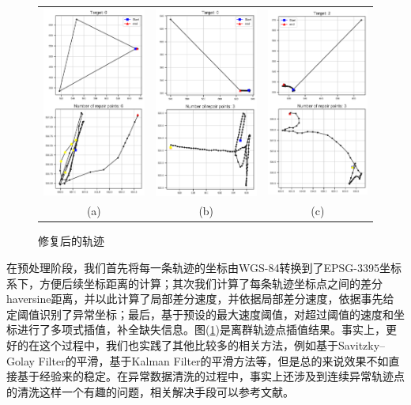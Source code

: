 \documentclass[UTF8, 12pt]{ctexart}
\begin{document}
		\begin{figure}[H]
			\centering
			\begin{tabular}{ccc}
				\includegraphics[width=0.27\linewidth]{..//plots//traj_filtering_396.png} & \includegraphics[width=0.27\linewidth]{..//plots//traj_filtering_691.png} &
				\includegraphics[width=0.27\linewidth]{..//plots//traj_filtering_1093.png} \\
				(a) & (b) & (c)
			\end{tabular}
			\caption{修复后的轨迹}
			\label{sec_2_fig_0}
			\vspace{-0.2cm}
		\end{figure}
		在预处理阶段，我们首先将每一条轨迹的坐标由WGS-84转换到了EPSG-3395坐标系下，方便后续坐标距离的计算；其次我们计算了每条轨迹坐标点之间的差分haversine距离，并以此计算了局部差分速度，并依据局部差分速度，依据事先给定阈值识别了异常坐标；最后，基于预设的最大速度阈值，对超过阈值的速度和坐标进行了多项式插值，补全缺失信息。图(\ref{sec_2_fig_0})是离群轨迹点插值结果。事实上，更好的在这个过程中，我们也实践了其他比较多的相关方法，例如基于Savitzky–Golay Filter\cite{Schafer2011What}的平滑，基于Kalman Filter\cite{Welch1995An}的平滑方法等，但是总的来说效果不如直接基于经验来的稳定。在异常数据清洗的过程中，事实上还涉及到连续异常轨迹点的清洗这样一个有趣的问题，相关解决手段可以参考文献\cite{Zhang2016Sequential}。
\end{document}
